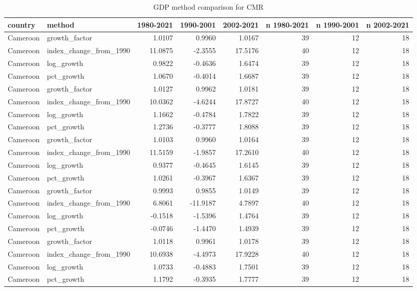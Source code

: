 \begin{table}

\caption{GDP method comparison for CMR}
\centering
\begin{tabular}[t]{llrrrrrr}
\toprule
country & method & 1980-2021 & 1990-2001 & 2002-2021 & n 1980-2021 & n 1990-2001 & n 2002-2021\\
\midrule
Cameroon & growth\_factor & 1.0107 & 0.9960 & 1.0167 & 39 & 12 & 18\\
Cameroon & index\_change\_from\_1990 & 11.0875 & -2.3555 & 17.5176 & 40 & 12 & 18\\
Cameroon & log\_growth & 0.9822 & -0.4636 & 1.6474 & 39 & 12 & 18\\
Cameroon & pct\_growth & 1.0670 & -0.4014 & 1.6687 & 39 & 12 & 18\\
Cameroon & growth\_factor & 1.0127 & 0.9962 & 1.0181 & 39 & 12 & 18\\
\addlinespace
Cameroon & index\_change\_from\_1990 & 10.0362 & -4.6244 & 17.8727 & 40 & 12 & 18\\
Cameroon & log\_growth & 1.1662 & -0.4784 & 1.7822 & 39 & 12 & 18\\
Cameroon & pct\_growth & 1.2736 & -0.3777 & 1.8088 & 39 & 12 & 18\\
Cameroon & growth\_factor & 1.0103 & 0.9960 & 1.0164 & 39 & 12 & 18\\
Cameroon & index\_change\_from\_1990 & 11.5159 & -1.9857 & 17.2610 & 40 & 12 & 18\\
\addlinespace
Cameroon & log\_growth & 0.9377 & -0.4645 & 1.6145 & 39 & 12 & 18\\
Cameroon & pct\_growth & 1.0261 & -0.3967 & 1.6367 & 39 & 12 & 18\\
Cameroon & growth\_factor & 0.9993 & 0.9855 & 1.0149 & 39 & 12 & 18\\
Cameroon & index\_change\_from\_1990 & 6.8061 & -11.9187 & 4.7897 & 40 & 12 & 18\\
Cameroon & log\_growth & -0.1518 & -1.5396 & 1.4764 & 39 & 12 & 18\\
\addlinespace
Cameroon & pct\_growth & -0.0746 & -1.4470 & 1.4939 & 39 & 12 & 18\\
Cameroon & growth\_factor & 1.0118 & 0.9961 & 1.0178 & 39 & 12 & 18\\
Cameroon & index\_change\_from\_1990 & 10.6938 & -4.4973 & 17.9228 & 40 & 12 & 18\\
Cameroon & log\_growth & 1.0733 & -0.4883 & 1.7501 & 39 & 12 & 18\\
Cameroon & pct\_growth & 1.1792 & -0.3935 & 1.7777 & 39 & 12 & 18\\

\end{tabular}
\end{table}
